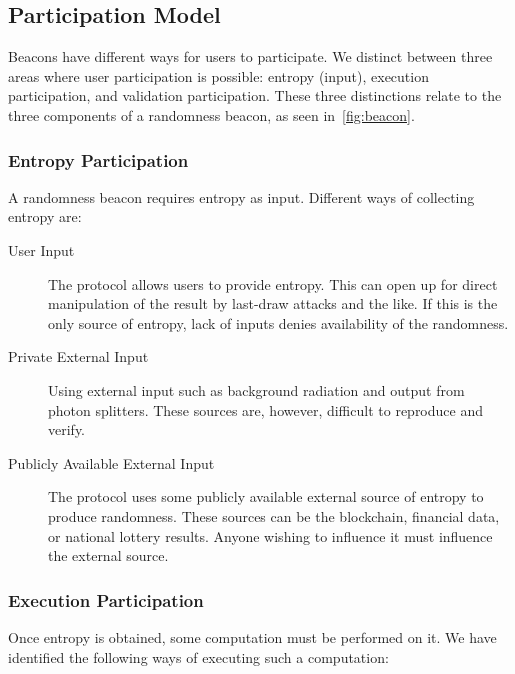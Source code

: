 \subsection{Participation Model}
\label{sub:participation_model}
Beacons have different ways for users to participate. We distinct between three areas where user participation is possible: entropy (input), execution participation, and validation participation. These three distinctions relate to the three components of a randomness beacon, as seen in~\vref{fig:beacon}.

\subsubsection{Entropy Participation}
A randomness beacon requires entropy as input. Different ways of collecting entropy are:

\begin{description}
    \item [User Input] The protocol allows users to provide entropy. This can open up for direct manipulation of the result by last-draw attacks and the like. If this is the only source of entropy, lack of inputs denies availability of the randomness.
    \item [Private External Input] Using external input such as background radiation and output from photon splitters. These sources are, however, difficult to reproduce and verify.
    \item [Publicly Available External Input] The protocol uses some publicly available external source of entropy to produce randomness. These sources can be the blockchain, financial data, or national lottery results. Anyone wishing to influence it must influence the external source.
\end{description}

\subsubsection{Execution Participation}
Once entropy is obtained, some computation must be performed on it. We have identified the following ways of executing such a computation:

